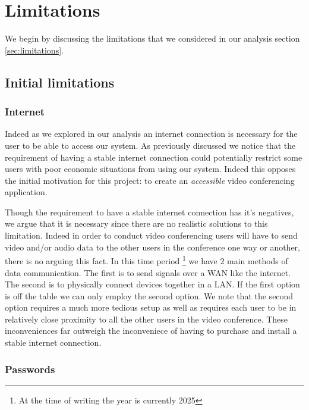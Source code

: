 \section{Limitations}

We begin by discussing the limitations that we considered in our analysis section \ref{sec:limitations}.

\subsection{Initial limitations}

\subsubsection{Internet}

Indeed as we explored in our analysis an internet connection is necessary for the user to be able to access our system.
As previously discussed we notice that the requirement of having a stable internet connection could potentially
restrict some users with poor economic situations from using our system. Indeed this opposes the initial motivation
for this project: to create an \textit{accessible} video conferencing application. \\ \vspace{0.2cm}

Though the requirement to have a stable internet connection has it's negatives, we argue that it is necessary since
there are no realistic solutions to this limitation. Indeed in order to conduct video conferencing users will have to
send video and/or audio data to the other users in the conference one way or another, there is no arguing this fact.
In this time period \footnote{At the time of writing the year is currently 2025} we have 2 main methods of data
communication. The first is to send signals over a WAN like the internet. The second is to physically connect devices
together in a LAN. If the first option is off the table we can only employ the second option. We note that the second
option requires a much more tedious setup as well as requires each user to be in relatively close proximity to all
the other users in the video conference. These inconveniences far outweigh the inconveniece of having to purchase and
install a stable internet connection.

\subsubsection{Passwords}

